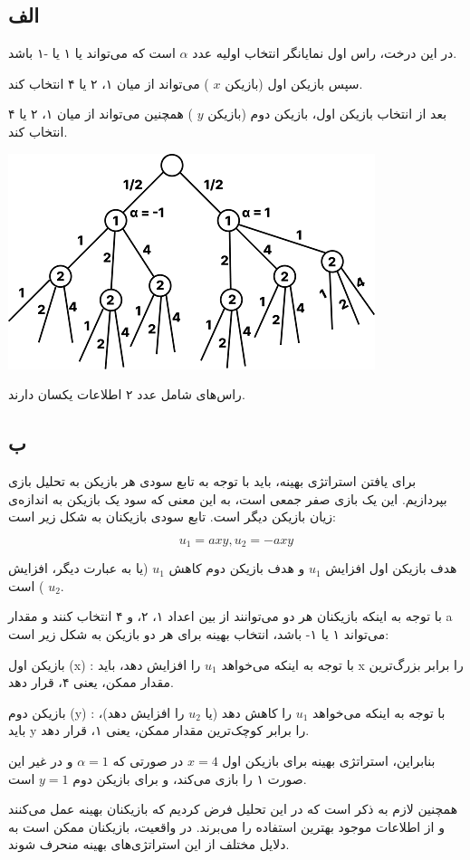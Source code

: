 \subsection*{الف}

در این درخت، راس اول نمایانگر انتخاب اولیه عدد 
$\alpha$
است که می‌تواند یا ۱ یا -۱ باشد. 


سپس بازیکن اول (بازیکن 
$x$
) می‌تواند از میان ۱، ۲ یا ۴ انتخاب کند. 


بعد از انتخاب بازیکن اول، بازیکن دوم (بازیکن
$y$
) همچنین می‌تواند از میان ۱، ۲ یا ۴ انتخاب کند.

\begin{center}
	\includegraphics{tree}
\end{center}

راس‌های شامل عدد ۲ اطلاعات یکسان دارند.

\subsection*{ب}

برای یافتن استراتژی بهینه، باید با توجه به تابع سودی هر بازیکن به تحلیل بازی بپردازیم. این یک بازی صفر جمعی است، به این معنی که سود یک بازیکن به اندازه‌ی زیان بازیکن دیگر است. تابع سودی بازیکنان به شکل زیر است:


$$
u_1 = axy , u_2 = - axy
$$

هدف بازیکن اول افزایش
$u_1$ 
و هدف بازیکن دوم کاهش
$u_1$ 
(یا به عبارت دیگر، افزایش
$u_2$
) است.

با توجه به اینکه بازیکنان هر دو می‌توانند از بین اعداد ۱، ۲، و ۴ انتخاب کنند و مقدار a می‌تواند ۱ یا ۱- باشد، انتخاب بهینه برای هر دو بازیکن به شکل زیر است:

بازیکن اول (x) : با توجه به اینکه می‌خواهد
$u_1$ 
را افزایش دهد، باید x را برابر بزرگ‌ترین مقدار ممکن، یعنی ۴، قرار دهد.

بازیکن دوم (y) : با توجه به اینکه می‌خواهد
$u_1$ 
را کاهش دهد (یا
$u_2$ 
را افزایش دهد)، باید y را برابر کوچک‌ترین مقدار ممکن، یعنی ۱، قرار دهد.

بنابراین، استراتژی بهینه برای بازیکن اول
$x=4$
در صورتی که
$\alpha =1$
و در غیر این صورت
۱ را بازی می‌کند،
و برای بازیکن دوم
$y=1$
است.

همچنین لازم به ذکر است که در این تحلیل فرض کردیم که بازیکنان بهینه عمل می‌کنند و از اطلاعات موجود بهترین استفاده را می‌برند. در واقعیت، بازیکنان ممکن است به دلایل مختلف از این استراتژی‌های بهینه منحرف شوند.








